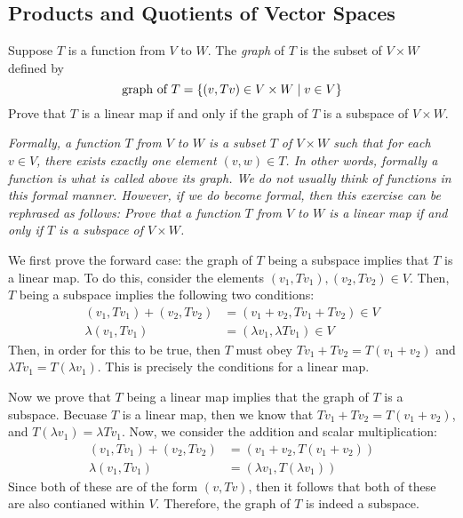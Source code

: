 \documentclass[10pt]{article}
\begin{document}
	\subsection{Products and Quotients of Vector Spaces}
	\begin{problem}
		Suppose \( T \) is a function from \( V \) to \( W \). The \textit{graph} of \( T \) is the subset 
		of \( V \times W \) defined by \[
		\text{graph of \( T \)} = \{(v, Tv) \in V \times W \mid v \in V\} 
		\] 
		Prove that \( T \) is a linear map if and only if the graph of \( T \) is a subspace of \( V \times W \).

		\begin{center}
			\begin{minipage}{0.9\textwidth} 
				\textit{Formally, a function \( T \) from \( V \) to \( W \) is a subset \( T \) of 
					\( V \times  W \) such that for each \( v \in V \), there exists exactly one element 
					\( (v, w) \in T \). In other words, formally a function is what is called above its graph. 
					We do not usually think of functions in this formal manner. However, if we do 
					become formal, then this exercise can be rephrased as follows: Prove that a function 
					\( T \) from \( V \) to \( W \) is a linear map if and only if \( T \) is a subspace 
				of \( V\times  W \). }
			\end{minipage}
		\end{center}
	\end{problem}

	\begin{solution}
		We first prove the forward case: the graph of \( T \) being a subspace implies that \( T \) is a 
		linear map. To do this, consider the elements \( (v_1, Tv_1), (v_2, Tv_2) \in V\). Then, \( T \) being a 
		subspace implies the following two conditions:
		\begin{align*}
			(v_1, Tv_1) + (v_2, Tv_2) &= (v_1 + v_2, Tv_1 + Tv_2) \in V\\
			\lambda(v_1, Tv_1) &= (\lambda v_1, \lambda Tv_1) \in V
		\end{align*}
		Then, in order for this to be true, then \( T \) must obey \( Tv_1 + Tv_2 = T(v_1 + v_2) \) and 
		\( \lambda Tv_1 = T(\lambda v_1) \). This is precisely the conditions for a linear map. 

		Now we prove that \( T \) being a linear map implies that the graph of \( T \) is a subspace. Becuase 
		\( T \) is a linear map, then we know that \( Tv_1 + Tv_2 = T(v_1 + v_2) \), and \( T(\lambda v_1) = 
		\lambda Tv_1\). Now, we consider the addition and scalar multiplication:
		\begin{align*}
			(v_1, Tv_1) + (v_2, Tv_2) &= (v_1 + v_2, T(v_1 + v_2))\\
			\lambda(v_1, Tv_1) &= (\lambda v_1, T(\lambda v_1))
		\end{align*}
		Since both of these are of the form \( (v, Tv) \), then it follows that both of these are also contianed 
		within \( V \). Therefore, the graph of \( T \) is indeed a subspace. 
	\end{solution}
\end{document}
